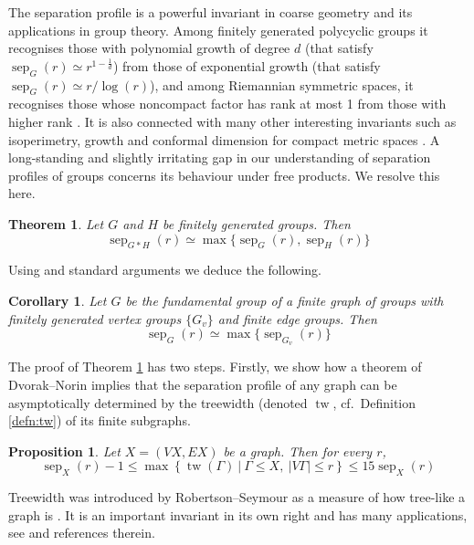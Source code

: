 \documentclass{article}
\numberwithin{equation}{section}
\newtheorem{theorem}[equation]{Theorem}
\newtheorem{proposition}[equation]{Proposition}
\newtheorem{corollary}[equation]{Corollary}
\theoremstyle{definition}
\theoremstyle{citing}
\DeclareMathOperator{\tw}{tw}
\DeclareMathOperator{\sep}{sep}
\newcommand{\setcon}[2]{\left\{#1\ \left|\ #2\right.\right\}}
\numberwithin{equation}{section}
\begin{document}
The separation profile is a powerful invariant in coarse geometry and its applications in group theory. Among finitely generated polycyclic groups it recognises those with polynomial growth of degree $d$ (that satisfy $\sep_G(r)\simeq r^{1-\frac1d}$) from those of exponential growth (that satisfy $\sep_G(r)\simeq r/\log(r)$), and among Riemannian symmetric spaces, it recognises those whose noncompact factor has rank at most 1 from those with higher rank \cite{HumeMackTess-Pprof,HumeMackTess-PprofLie}. It is also connected with many other interesting invariants such as isoperimetry, growth and conformal dimension for compact metric spaces \cite{LeCozGournay,GladShum,HumeMack_confdim}. A long-standing and slightly irritating gap in our understanding of separation profiles of groups concerns its behaviour under free products. We resolve this here.

\begin{theorem}\label{thm:sepfreeprod}
    Let $G$ and $H$ be finitely generated groups. Then
    \[
    \sep_{G*H}(r)\simeq \max\{\sep_G(r),\sep_H(r)\}
    \]
\end{theorem}

Using \cite{PW02} and standard arguments we deduce the following.

\begin{corollary}\label{cor:graphofgroups}
    Let $G$ be the fundamental group of a finite graph of groups with finitely generated vertex groups $\{G_v\}$ and finite edge groups. Then
    \[
    \sep_{G}(r)\simeq \max\{\sep_{G_v}(r)\}
    \]
\end{corollary}

    
The proof of Theorem \ref{thm:sepfreeprod} has two steps. Firstly, we show how a theorem of Dvorak--Norin implies that the separation profile of any graph can be asymptotically determined by the treewidth (denoted $\tw$, cf.\ Definition \ref{defn:tw}) of its finite subgraphs.

\begin{proposition}\label{prop:twsepequiv}
    Let $X=(VX,EX)$ be a graph. Then for every $r$,
    \[
    \sep_X(r)-1 \leq \max\setcon{\tw(\Gamma)}{\Gamma\leq X,\ |V\Gamma|\leq r} \leq 15\sep_X(r)
    \]
\end{proposition}

Treewidth was introduced by Robertson--Seymour as a measure of how tree-like a graph is \cite{RobSey_tw}. It is an important invariant in its own right and has many applications, see \cite{Bodlaender_treewidth} and references therein.
\end{document}
